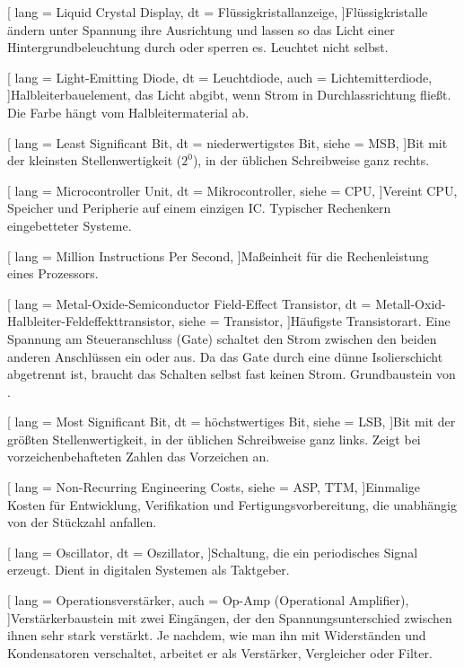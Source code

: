 [
  lang  = Liquid Crystal Display,
  dt    = Flüssigkristallanzeige,
]{Flüssigkristalle ändern unter Spannung ihre Ausrichtung und lassen so das Licht einer Hintergrundbeleuchtung durch oder sperren es. Leuchtet nicht selbst.}

[
  lang  = Light-Emitting Diode,
  dt    = Leuchtdiode,
  auch  = Lichtemitterdiode,
]{Halbleiterbauelement, das Licht abgibt, wenn Strom in Durchlassrichtung fließt. Die Farbe hängt vom Halbleitermaterial ab.}

[
  lang  = Least Significant Bit,
  dt    = niederwertigstes Bit,
  siehe = MSB,
]{Bit mit der kleinsten Stellenwertigkeit ($2^0$), in der üblichen Schreibweise ganz rechts.}

[
  lang  = Microcontroller Unit,
  dt    = Mikrocontroller,
  siehe = CPU,
]{Vereint CPU, Speicher und Peripherie auf einem einzigen IC. Typischer Rechenkern eingebetteter Systeme.}

[
  lang  = Million Instructions Per Second,
]{Maßeinheit für die Rechenleistung eines Prozessors.}

[
  lang  = Metal-Oxide-Semiconductor Field-Effect Transistor,
  dt    = Metall-Oxid-Halbleiter-Feldeffekttransistor,
  siehe = Transistor,
]{Häufigste Transistorart. Eine Spannung am Steueranschluss (Gate) schaltet den Strom zwischen den beiden anderen Anschlüssen ein oder aus. Da das Gate durch eine dünne Isolierschicht abgetrennt ist, braucht das Schalten selbst fast keinen Strom. Grundbaustein von .}

[
  lang  = Most Significant Bit,
  dt    = höchstwertiges Bit,
  siehe = LSB,
]{Bit mit der größten Stellenwertigkeit, in der üblichen Schreibweise ganz links. Zeigt bei vorzeichenbehafteten Zahlen das Vorzeichen an.}

[
  lang  = Non-Recurring Engineering Costs,
  siehe = {ASP, TTM},
]{Einmalige Kosten für Entwicklung, Verifikation und Fertigungsvorbereitung, die unabhängig von der Stückzahl anfallen.}

[
  lang  = Oscillator,
  dt    = Oszillator,
]{Schaltung, die ein periodisches Signal erzeugt. Dient in digitalen Systemen als Taktgeber.}

[
  lang  = Operationsverstärker,
  auch  = Op-Amp (Operational Amplifier),
]{Verstärkerbaustein mit zwei Eingängen, der den Spannungsunterschied zwischen ihnen sehr stark verstärkt. Je nachdem, wie man ihn mit Widerständen und Kondensatoren verschaltet, arbeitet er als Verstärker, Vergleicher oder Filter.}

